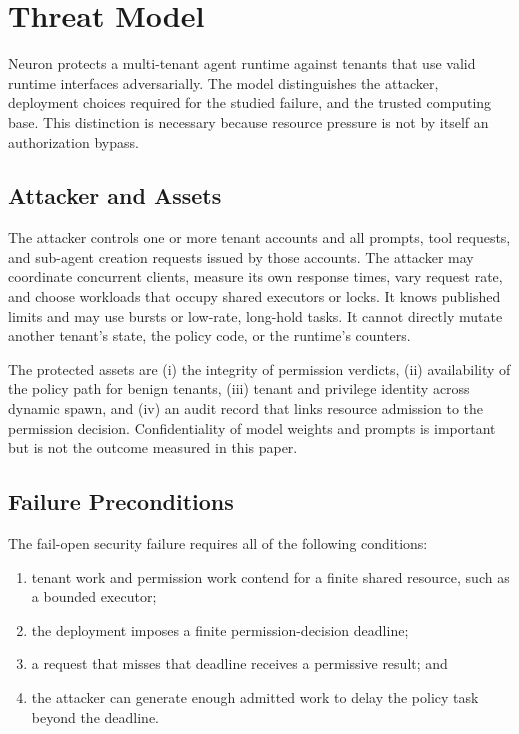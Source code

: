 \section{Threat Model}
\label{sec:threat}
\label{sec:lim-failure}

Neuron protects a multi-tenant agent runtime against tenants that use valid
runtime interfaces adversarially. The model distinguishes the attacker,
deployment choices required for the studied failure, and the trusted
computing base. This distinction is necessary because resource pressure is
not by itself an authorization bypass.

\subsection{Attacker and Assets}

The attacker controls one or more tenant accounts and all prompts, tool
requests, and sub-agent creation requests issued by those accounts. The
attacker may coordinate concurrent clients, measure its own response times,
vary request rate, and choose workloads that occupy shared executors or
locks. It knows published limits and may use bursts or low-rate, long-hold
tasks. It cannot directly mutate another tenant's state, the policy code, or
the runtime's counters.

The protected assets are (i) the integrity of permission verdicts,
(ii) availability of the policy path for benign tenants, (iii) tenant and
privilege identity across dynamic spawn, and (iv) an audit record that links
resource admission to the permission decision. Confidentiality of model
weights and prompts is important but is not the outcome measured in this
paper.

\subsection{Failure Preconditions}

The fail-open security failure requires all of the following conditions:

\begin{enumerate}
  \item tenant work and permission work contend for a finite shared resource,
  such as a bounded executor;
  \item the deployment imposes a finite permission-decision deadline;
  \item a request that misses that deadline receives a permissive result; and
  \item the attacker can generate enough admitted work to delay the policy
  task beyond the deadline.
\end{enumerate}

